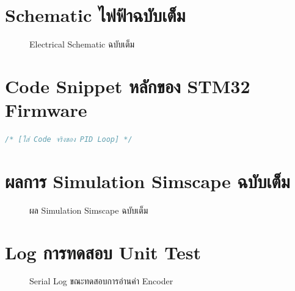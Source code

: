\section{Schematic ไฟฟ้าฉบับเต็ม}
\label{sec:full_electrical_schematic}

\begin{figure}[H]
  \centering
  \caption{Electrical Schematic ฉบับเต็ม}
  \label{fig:schematic_full}
\end{figure}

\section{Code Snippet หลักของ STM32 Firmware}
\label{sec:firmware_code_snippets}

\begin{lstlisting}[language=C, caption={ตัวอย่าง PID Control Loop บน STM32}]
/* [ใส่ Code จริงของ PID Loop] */
\end{lstlisting}

\section{ผลการ Simulation Simscape ฉบับเต็ม}
\label{sec:simscape_simulation_results}

\begin{figure}[H]
  \centering
  \caption{ผล Simulation Simscape ฉบับเต็ม}
  \label{fig:simscape_full}
\end{figure}

\section{Log การทดสอบ Unit Test}
\label{sec:unit_test_logs}

\begin{figure}[H]
  \centering
  \caption{Serial Log ขณะทดสอบการอ่านค่า Encoder}
  \label{fig:serial_log}
\end{figure}